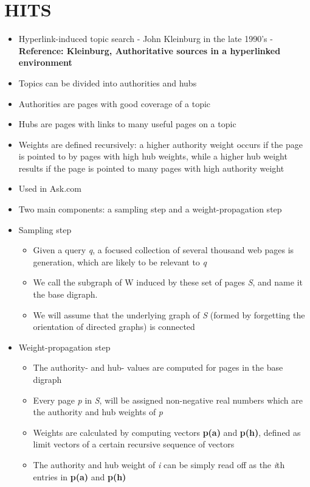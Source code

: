 \documentclass[11pt]{report}
\begin{document}
\section{HITS}
\begin{itemize}
\item Hyperlink-induced topic search - John Kleinburg in the late 1990's - \textbf{Reference: Kleinburg, Authoritative sources in a hyperlinked environment}
\item Topics can be divided into authorities and hubs
\item Authorities are pages with good coverage of a topic
\item Hubs are pages with links to many useful pages on a topic
\item Weights are defined recursively: a higher authority weight occurs if the page is pointed to by pages with high hub weights, while a higher hub weight results if the page is pointed to many pages with high authority weight
\item Used in Ask.com 
\item Two main components: a sampling step and a weight-propagation step
\item Sampling step
\begin{itemize}
\item Given a query \textit{q}, a focused collection of several thousand web pages is generation, which are likely to be relevant to \textit{q}
\item We call the subgraph of W induced by these set of pages \textit{S}, and name it the base digraph.
\item We will assume that the underlying graph of \textit{S} (formed by forgetting the orientation of directed graphs) is connected
\end{itemize}
\item Weight-propagation step
\begin{itemize}
\item The authority- and hub- values are computed for pages in the base digraph
\item Every page \textit{p} in \textit{S}, will be assigned non-negative real numbers which are the authority and hub weights of \textit{p}
\item Weights are calculated by computing vectors \textbf{p(a)} and \textbf{p(h)}, defined as limit vectors of a certain recursive sequence of vectors
\item The authority and hub weight of \textit{i} can be simply read off as the \textit{i}th entries in \textbf{p(a)} and \textbf{p(h)}

\end{itemize}
\end{itemize}
\end{document}
